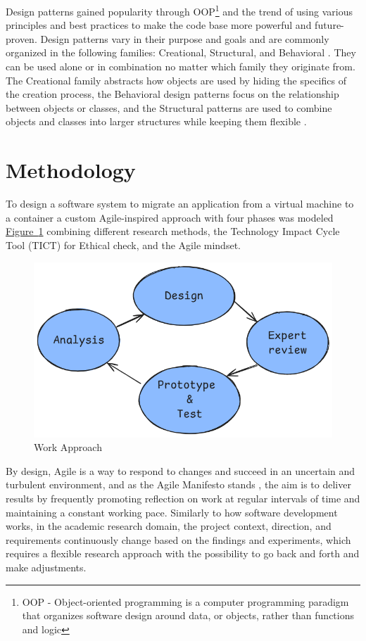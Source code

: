 \documentclass[twocolumn]{article}
\newcommand{\FigRef}[1]{\hyperref[#1]{Figure~\ref{#1}}}
\begin{document}
Design patterns gained popularity through OOP\footnote{OOP - Object-oriented programming is a computer programming paradigm that organizes software design around data, or objects, rather than functions and logic} and the trend of using various principles and best practices to make the code base more powerful and future-proven. Design patterns vary in their purpose and goals and are commonly organized in the following families: Creational, Structural, and Behavioral \cite{GammaEtAl-1993}. They can be used alone or in combination no matter which family they originate from. The Creational family abstracts how objects are used by hiding the specifics of the creation process, the Behavioral design patterns focus on the relationship between objects or classes, and the Structural patterns are used to combine objects and classes into larger structures while keeping them flexible \cite{GammaEtAl-1993}. 

\section{Methodology}
To design a software system to migrate an application from a virtual machine to a container a custom Agile-inspired approach with four phases was modeled \FigRef{fig:work_approach} combining different research methods, the Technology Impact Cycle Tool (TICT) for Ethical check, and the Agile mindset.

\begin{figure}[H]
    \centering
    \includegraphics[width=\linewidth]{images/approach.png}
    \caption{Work Approach}
    \label{fig:work_approach}
\end{figure}

By design, Agile is a way to respond to changes and succeed in an uncertain and turbulent environment, and as the Agile Manifesto stands \cite{BeckEtAl-2001}, the aim is to deliver results by frequently promoting reflection on work at regular intervals of time and maintaining a constant working pace. Similarly to how software development works, in the academic research domain, the project context, direction, and requirements continuously change based on the findings and experiments, which requires a flexible research approach with the possibility to go back and forth and make adjustments. \\
\end{document}
